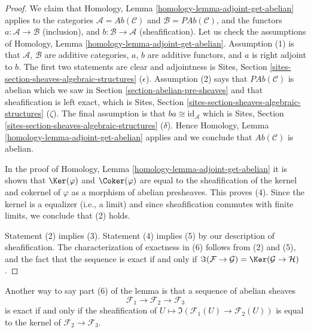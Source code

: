 \begin{proof}
We claim that Homology, Lemma \ref{homology-lemma-adjoint-get-abelian}
applies to the categories $\mathcal{A} = \textit{Ab}(\mathcal{C})$
and $\mathcal{B} = \textit{PAb}(\mathcal{C})$, and the functors
$a : \mathcal{A} \to \mathcal{B}$ (inclusion),  and
$b : \mathcal{B} \to \mathcal{A}$ (sheafification).
Let us check the assumptions of
Homology, Lemma \ref{homology-lemma-adjoint-get-abelian}.
Assumption (1) is that $\mathcal{A}$, $\mathcal{B}$ are additive categories,
$a$, $b$ are additive functors, and $a$ is right adjoint to $b$.
The first two statements are clear and adjointness is
Sites, Section \ref{sites-section-sheaves-algebraic-structures} ($\epsilon$).
Assumption (2) says that $\textit{PAb}(\mathcal{C})$ is abelian
which we saw in Section \ref{section-abelian-pre-sheaves} and
that sheafification is left exact, which is
Sites, Section \ref{sites-section-sheaves-algebraic-structures} ($\zeta$).
The final assumption is that $ba \cong \text{id}_\mathcal{A}$ which is
Sites, Section \ref{sites-section-sheaves-algebraic-structures} ($\delta$).
Hence Homology, Lemma \ref{homology-lemma-adjoint-get-abelian}
applies and we conclude that $\textit{Ab}(\mathcal{C})$ is abelian.

\medskip\noindent
In the proof of Homology, Lemma \ref{homology-lemma-adjoint-get-abelian}
it is shown that $\Ker(\varphi)$ and $\Coker(\varphi)$
are equal to the sheafification of the kernel and cokernel of $\varphi$
as a morphism of abelian presheaves. This proves (4). Since the kernel
is a equalizer (i.e., a limit) and since sheafification commutes with
finite limits, we conclude that (2) holds.

\medskip\noindent
Statement (2) implies (3). Statement (4) implies (5) by our description
of sheafification. The characterization of exactness in (6) follows from
(2) and (5), and the fact that the sequence is exact if and only if
$\Im(\mathcal{F} \to \mathcal{G}) =
\Ker(\mathcal{G} \to \mathcal{H})$.
\end{proof}

\noindent
Another way to say part (6) of the lemma is that a
sequence of abelian sheaves
$$
\mathcal{F}_1 \longrightarrow
\mathcal{F}_2 \longrightarrow
\mathcal{F}_3
$$
is exact if and only if the sheafification of
$U \mapsto \Im(\mathcal{F}_1(U) \to \mathcal{F}_2(U))$
is equal to the kernel of $\mathcal{F}_2 \to \mathcal{F}_3$.

